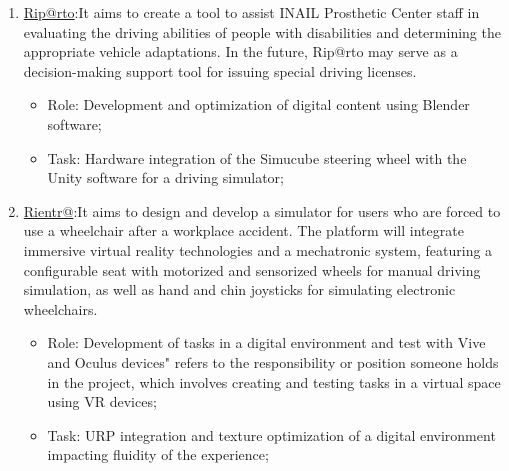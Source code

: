 {\begin{enumerate}
                \begin{itemize}
                \item Role: Development (Parametric design and 3D print) of modular and multipurpose accessories for the neuromotor recovery of children with cerebral palsy compatible with the PhiCube Device;
                \item Tasks: Development of a user interface and serious game for a digital platform compatible with the PhiCube device.Integrating a common joystick with serious games to conduct comparison tests with the PhiCube console;
                \end{itemize}
\item\href{https://www.stiima.cnr.it/progetti-ricerca/riprto/}{\color{blue}Rip@rto}:It aims to create a tool to assist INAIL Prosthetic Center staff in evaluating the driving abilities of people with disabilities and determining the appropriate vehicle adaptations. In the future, Rip@rto may serve as a decision-making support tool for issuing special driving licenses.
                \begin{itemize} 
                \item Role: Development and optimization of digital content using Blender software;
                \item Task: Hardware integration of the Simucube steering wheel with the Unity software for a driving simulator;
                \end{itemize}
\item\href{https://www.stiima.cnr.it/progetti-ricerca/riprto/}{\color{blue} Rientr@}:It aims to design and develop a simulator for users who are forced to use a wheelchair after a workplace accident. The platform will integrate immersive virtual reality technologies and a mechatronic system, featuring a configurable seat with motorized and sensorized wheels for manual driving simulation, as well as hand and chin joysticks for simulating electronic wheelchairs.
                \begin{itemize} 
                \item Role: Development of tasks in a digital environment and test with Vive and Oculus devices" refers to the responsibility or position someone holds in the project, which involves creating and testing tasks in a virtual space using VR devices;
                \item Task: URP integration and texture optimization of a digital environment impacting fluidity of the experience;
                \end{itemize}
\end{enumerate}
}